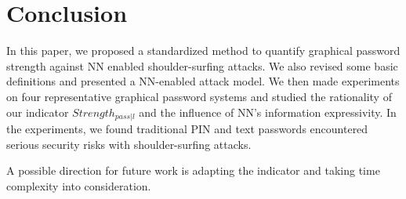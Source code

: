 \documentclass{article}
\begin{document}
  \section{Conclusion}
  \label{sec:conclusion}
  In this paper, we proposed a standardized method to quantify graphical password strength against NN enabled 
  shoulder-surfing attacks. We also revised some basic definitions and presented a NN-enabled attack model. 
  We then made experiments on four representative graphical password systems and studied the rationality of 
  our indicator $Strength_{pass|l}$ and the influence of NN's information expressivity. In the experiments, 
  we found traditional PIN and text passwords encountered serious security risks with shoulder-surfing attacks. 
  
  A possible direction for future work is adapting the indicator and taking time complexity into consideration.
  
  
  
  
  
  
  \vfill\pagebreak
  
  
  
  
  
  
\end{document}
